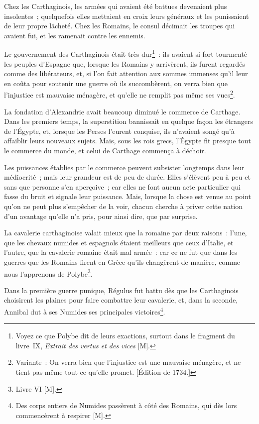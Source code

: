 \documentclass[french,twoside]{book} %
\begin{document}
Chez les Carthaginois, les armées qui avaient été battues devenaient plus insolentes ; quelquefois elles mettaient en croix leurs généraux et les punissaient de leur propre lâcheté. Chez les Romains, le consul décimait les troupes qui avaient fui, et les ramenait contre les ennemis.\par
Le gouvernement des Carthaginois était très dur\footnote{Voyez ce que Polybe dit de leurs exactions, surtout dans le fragment du livre IX, {\itshape Extrait des vertus et des vices} [M].} : ils avaient si fort tourmenté les peuples d’Espagne que, lorsque les Romains y arrivèrent, ils furent regardés comme des libérateurs, et, si l’on fait attention aux sommes immenses qu’il leur en coûta pour soutenir une guerre où ils succombèrent, on verra bien que l’injustice est mauvaise ménagère, et qu’elle ne remplit pas même ses vues\footnote{Variante : On verra bien que l’injustice est une mauvaise ménagère, et ne tient pas même tout ce qu’elle promet. [Édition de 1734.]}.\par
La fondation d’Alexandrie avait beaucoup diminué le commerce de Carthage. Dans les premiers temps, la superstition bannissait en quelque façon les étrangers de l’Égypte, et, lorsque les Perses l’eurent conquise, ils n’avaient songé qu’à affaiblir leurs nouveaux sujets. Mais, sous les rois grecs, l’Égypte fit presque tout le commerce du monde, et celui de Carthage commença à déchoir.\par
Les puissances établies par le commerce peuvent subsister longtemps dans leur médiocrité ; mais leur grandeur est de peu de durée. Elles s’élèvent peu à peu et sans que personne s’en aperçoive ; car elles ne font aucun acte particulier qui fasse du bruit et signale leur puissance. Mais, lorsque la chose est venue au point qu’on ne peut plus s’empêcher de la voir, chacun cherche à priver cette nation d’un avantage qu’elle n’a pris, pour ainsi dire, que par surprise.\par
La cavalerie carthaginoise valait mieux que la romaine par deux raisons : l’une, que les chevaux numides et espagnols étaient meilleurs que ceux d’Italie, et l’autre, que la cavalerie romaine était mal armée : car ce ne fut que dans les guerres que les Romains firent en Grèce qu’ils changèrent de manière, comme nous l’apprenons de Polybe\footnote{Livre VI [M].}.\par
Dans la première guerre punique, Régulus fut battu dès que les Carthaginois choisirent les plaines pour faire combattre leur cavalerie, et, dans la seconde, Annibal dut à ses Numides ses principales victoires\footnote{Des corps entiers de Numides passèrent à côté des Romains, qui dès lors commencèrent à respirer [M].}.\par
\end{document}
